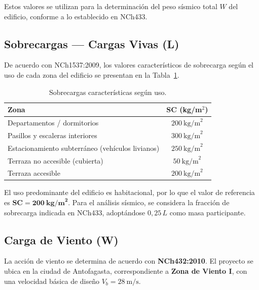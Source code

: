 Estos valores se utilizan para la determinación del peso sísmico total $W$ del edificio, conforme a lo establecido en NCh433.

\subsection{Sobrecargas --- Cargas Vivas (L)}

De acuerdo con NCh1537:2009, los valores característicos de sobrecarga según el uso de cada zona del edificio se presentan en la Tabla~\ref{tab:cargas_vivas}.

\begin{table}[H]
    \centering
    \caption{Sobrecargas características según uso.}\label{tab:cargas_vivas}
    \begin{tabular}{lc}
        \hline
        \textbf{Zona} & \textbf{SC (kg/m$^2$)} \\
        \hline
        Departamentos / dormitorios                      & $200\ \text{kg/m}^2$ \\
        Pasillos y escaleras interiores                  & $300\ \text{kg/m}^2$ \\
        Estacionamiento subterráneo (vehículos livianos) & $250\ \text{kg/m}^2$ \\
        Terraza no accesible (cubierta)                  & $50\ \text{kg/m}^2$  \\
        Terraza accesible                                & $200\ \text{kg/m}^2$ \\
        \hline
    \end{tabular}
\end{table}

El uso predominante del edificio es habitacional, por lo que el valor de referencia es $\mathbf{SC = 200\ \text{kg/m}^2}$. Para el análisis sísmico, se considera la fracción de sobrecarga indicada en NCh433, adoptándose $0{,}25\,L$ como masa participante.

\subsection{Carga de Viento (W)}

La acción de viento se determina de acuerdo con \textbf{NCh432:2010}. El proyecto se ubica en la ciudad de Antofagasta, correspondiente a \textbf{Zona de Viento I}, con una velocidad básica de diseño $V_b = 28\ \text{m/s}$.

